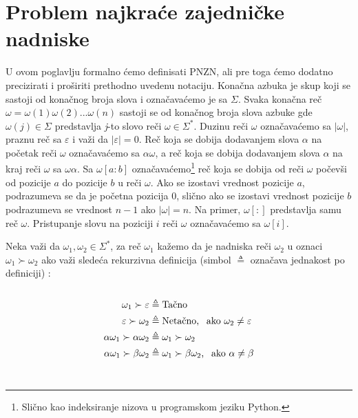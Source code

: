 \documentclass[12pt,oneside]{memoir}
\begin{document}
\section{Problem najkraće zajedničke nadniske}
U ovom poglavlju formalno ćemo definisati PNZN, ali pre toga ćemo dodatno precizirati i proširiti prethodno uvedenu notaciju. Konačna azbuka je skup koji se sastoji
od konačnog broja slova i označavaćemo je sa $\Sigma$. Svaka konačna reč
$\omega=\omega(1)\omega(2)...\omega(n)$ sastoji se od konačnog broja slova azbuke gde $\omega(j)\in\Sigma$ predstavlja \textit{j}-to slovo reči $\omega\in\Sigma^*$.
Duzinu reči $\omega$ označavaćemo sa $|\omega|$, praznu reč sa $\varepsilon$ i važi da $|\varepsilon|=0$. 
Reč koja se dobija dodavanjem
slova $\alpha$ na početak reči $\omega$ označavaćemo sa $\alpha\omega$,
a reč koja se dobija dodavanjem slova $\alpha$ na kraj reči $\omega$ sa $\omega\alpha$.
Sa $\omega[a:b]$ označavaćemo\footnote{Slično kao indeksiranje nizova u programskom jeziku Python.} reč koja se dobija od
reči $\omega$ počevši od pozicije $a$ do pozicije $b$ u reči $\omega$. Ako se izostavi vrednost pozicije $a$, podrazumeva se
da je početna pozicija 0, slično ako se izostavi vrednost pozicije $b$ podrazumeva se vrednost $n-1$ ako $|\omega|=n$.
Na primer, $\omega[:]$ predstavlja samu reč $\omega$. Pristupanje slovu na poziciji $i$ reči $\omega$ 
označavaćemo sa $\omega[i]$.

Neka važi da $\omega_{1},\omega_{2}\in\Sigma^*$, za reč $\omega_{1}$ kažemo da je
nadniska reči $\omega_{2}$ u oznaci $\omega_{1}\succ\omega_{2}$ ako važi sledeća
rekurzivna definicija (simbol $\triangleq$ označava jednakost po definiciji) \cite{ProbabilisticBS}:
\\
\\
\begin{equation}
\begin{aligned}
\omega_{1}\succ\varepsilon &\triangleq \textrm{Tačno}\\
\varepsilon\succ\omega_{2} &\triangleq \textrm{Netačno, \:\:ako } \omega_{2}\neq\varepsilon\\
\alpha\omega_{1}\succ\alpha\omega_{2} &\triangleq \omega_{1}\succ\omega_{2}\\
\alpha\omega_{1}\succ\beta\omega_{2} &\triangleq \omega_{1}\succ\beta\omega_{2} \textrm{, \:\:ako } \alpha\neq\beta
\end{aligned}
\end{equation}
\\
\end{document}
